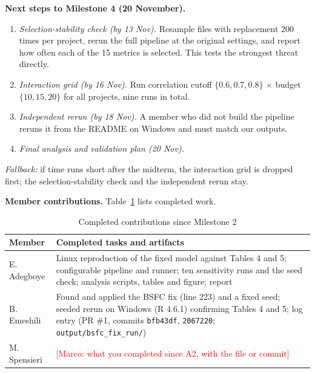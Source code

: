 \documentclass[conference]{IEEEtran}
\newcommand{\todo}[1]{\textcolor{red}{[#1]}}
\begin{document}
\textbf{Next steps to Milestone 4 (20 November).}
\begin{enumerate}
\item \emph{Selection-stability check (by 13 Nov).} Resample files with replacement 200 times per project, rerun the full pipeline at the original settings, and report how often each of the 15 metrics is selected. This tests the strongest threat directly.
\item \emph{Interaction grid (by 16 Nov).} Run correlation cutoff $\{0.6, 0.7, 0.8\}$ $\times$ budget $\{10, 15, 20\}$ for all projects, nine runs in total.
\item \emph{Independent rerun (by 18 Nov).} A member who did not build the pipeline reruns it from the README on Windows and must match our outputs.
\item \emph{Final analysis and validation plan (20 Nov).}
\end{enumerate}
\emph{Fallback:} if time runs short after the midterm, the interaction grid is dropped first; the selection-stability check and the independent rerun stay.

\textbf{Member contributions.} Table~\ref{tab:contrib} lists completed work.

\begin{table}[!t]
\centering
\caption{Completed contributions since Milestone 2}
\label{tab:contrib}
\footnotesize
\begin{tabular}{@{}p{}p{}@{}}
\toprule
Member & Completed tasks and artifacts \\
\midrule
E. Adegboye & Linux reproduction of the fixed model against Tables 4 and 5; configurable pipeline and runner; ten sensitivity runs and the seed check; analysis scripts, tables and figure; report \\
B. Emeshili & Found and applied the BSFC fix (line 223) and a fixed seed; seeded rerun on Windows (R 4.6.1) confirming Tables 4 and 5; log entry (PR \#1, commits \texttt{bfb43df}, \texttt{2067220}; \texttt{output/bsfc\_fix\_run/}) \\
M. Spensieri & \todo{Marco: what you completed since A2, with the file or commit} \\
\bottomrule
\end{tabular}
\end{table}
\end{document}
